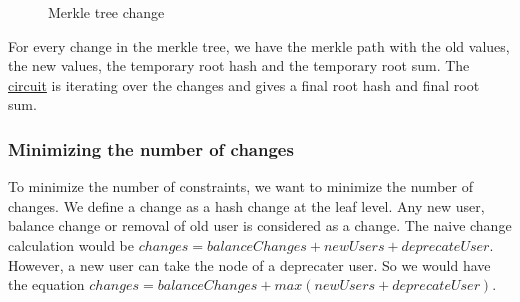 \begin{figure}
   \hfill
   \hfill
   \hfill
   \caption{Merkle tree change}
   \end{figure}


For every change in the merkle tree, we have the merkle path with the old values, the new values, the temporary root hash and
the temporary root sum.
The \hyperref[subsec:plcc]{circuit} is iterating over the changes and gives a final root hash and final root sum.

\subsubsection{Minimizing the number of changes}
To minimize the number of constraints, we want to minimize the number of changes.
We define a change as a hash change at the leaf level. Any new user, balance change or removal of old user is considered as a change.
The naive change calculation would be $changes = balanceChanges + newUsers + deprecateUser$.
However, a new user can take the node of a deprecater user. So we would have the equation $changes = balanceChanges +max(newUsers + deprecateUser)$.


